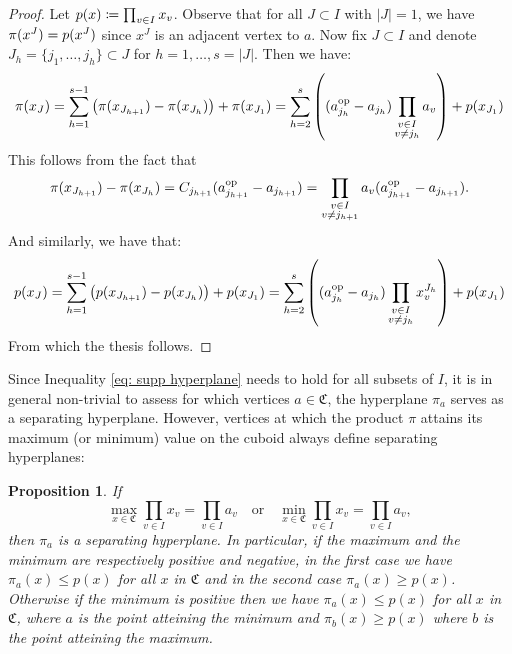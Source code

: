 \documentclass{article}
\newtheorem{proposition}[theorem]{Proposition}
\begin{document}
\begin{proof}

Let \(p(x) \coloneqq \prod_{v \in I}x_v\).	Observe that for all \(J \subset I\) with \(|J| = 1\), we have \(\pi(x^J) = p(x^J)\) since \(x^J\) is an adjacent vertex to \(a\).
%
 Now fix \(J \subset I\) and denote \(J_h = \{j_1,\ldots,j_h\} \subset J\) for \(h=1,\ldots,s=|J|\).
	Then we have:
	\begin{equation}
		\label{eq: supp hyperplane}
		\pi(x_J) = \sum_{h=1}^{s-1} \left(\pi({x_{J_{h+1}}}) - \pi({x_{J_{h}}})\right) + \pi({x_{J_1}}) = \sum_{h=2}^{s}  \left((a^{\text{op}}_{j_h}-a_{j_h})\prod_{\substack{v \in I \\ v \neq j_h}}a_v\right) + p({x_{J_1}})
	\end{equation}
	This follows from the fact that 
	\[\pi({x_{J_{h+1}}}) - \pi({x_{J_{h}}}) = C_{j_{h+1}} (a^{\text{op}}_{j_{h+1}} - a_{j_{h+1}}) = \prod_{\substack{v \in I \\ v \neq j_{h+1}}}a_v (a^{\text{op}}_{j_{h+1}} - a_{j_{h+1}}).\] 
	And similarly, we have that:
	\begin{equation}
			p({x_J})  = \sum_{h=1}^{s-1} \left(p({x_{J_{h+1}}}) - p({x_{J_{h}}})\right) + p({x_{J_1}}) = \sum_{h=2}^{s}  \left((a^{\text{op}}_{j_h}-a_{j_h})\prod_{\substack{v \in I \\ v \neq j_h}} x^{J_h}_v\right) + p({x_{J_1}})
	\end{equation}
	From which the thesis follows.
	\end{proof}
Since Inequality \eqref{eq: supp hyperplane} needs to hold for all subsets of \(I\), it is in general non-trivial to assess for which vertices \(a \in \mathfrak{C}\), the hyperplane \(\pi_a\) serves as a separating hyperplane. 
However, vertices at which the product \(\pi\) attains its maximum (or minimum) value on the cuboid always define separating hyperplanes:

\begin{proposition}
	If 
	\[
	\max_{x \in \mathfrak{C}}\prod_{v \in I}x_v = \prod_{v \in I}a_v 
	\quad\text{or}\quad 
	\min_{x \in \mathfrak{C}}\prod_{v \in I}x_v = \prod_{v \in I}a_v,
	\]
	then \(\pi_a\) is a separating hyperplane. 
	In particular, if the maximum and the minimum are respectively positive and negative, in the first case we have \(\pi_a(x) \leq p(x)\) for all \(x\) in \(\mathfrak{C}\) and in the second case \(\pi_a(x) \geq p(x)\).
	Otherwise if the minimum is positive then we have \(\pi_a(x) \leq p(x)\) for all \(x\) in \(\mathfrak{C}\), where \(a\) is the point atteining the minimum and  \(\pi_b(x) \geq p(x)\) where \(b\) is the point atteining the maximum.

	\end{proposition}
	
\end{document}
